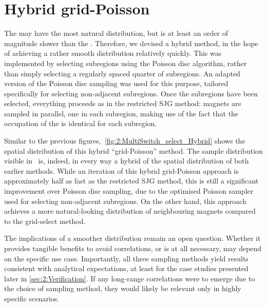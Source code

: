 \section{Hybrid grid-Poisson}
The  may have the most natural distribution, but is at least an order of magnitude slower than the .
Therefore, we devised a hybrid method, in the hope of achieving a rather smooth distribution relatively quickly.
This was implemented by selecting subregions using the Poisson disc algorithm, rather than simply selecting a regularly spaced quarter of subregions.
An adapted version of the Poisson disc sampling was used for this purpose, tailored specifically for selecting non-adjacent subregions.
Once the subregions have been selected, everything proceeds as in the restricted SJG method: magnets are sampled in parallel, one in each subregion, making use of the fact that the occupation of the  is identical for each subregion. \\\par
Similar to the previous figures,~\cref{fig:2:MultiSwitch_select_Hybrid} shows the spatial distribution of this hybrid ``grid-Poisson'' method.
The sample distribution visible in~ is, indeed, in every way a hybrid of the spatial distribution of both earlier methods.
While an iteration of this hybrid grid-Poisson approach is approximately half as fast as the restricted SJG method, this is still a significant improvement over Poisson disc sampling, due to the optimised Poisson sampler used for selecting non-adjacent subregions.
On the other hand, this approach achieves a more natural-looking distribution of neighbouring magnets compared to the grid-select method. \\\par

The implications of a smoother distribution remain an open question.
Whether it provides tangible benefits to avoid correlations, or is at all necessary, may depend on the specific use case.
Importantly, all three sampling methods yield results consistent with analytical expectations, at least for the case studies presented later in \cref{sec:2:Verification}.
If any long-range correlations were to emerge due to the choice of sampling method, they would likely be relevant only in highly specific scenarios.

